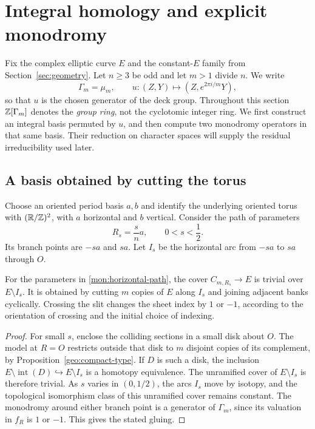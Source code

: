 \section{Integral homology and explicit monodromy}\label{sec:monodromy}

Fix the complex elliptic curve $E$ and the constant-$E$ family from
Section~\ref{sec:geometry}.  Let $n\geq3$ be odd and let $m>1$ divide
$n$.  We write
\[
 \Gamma_m=\mu_m,\qquad u:(Z,Y)\longmapsto(Z,e^{2\pi i/m}Y),
\]
so that $u$ is the chosen generator of the deck group.
Throughout this section $\mathbb Z[\Gamma_m]$ denotes the \emph{group ring}, not
the cyclotomic integer ring.  We first construct an integral basis
permuted by $u$, and then compute two monodromy operators in that same
basis.  Their reduction on character spaces will supply the residual
irreducibility used later.

\subsection{A basis obtained by cutting the torus}

Choose an oriented period basis $a,b$ and identify the underlying
oriented torus with $(\mathbb R/\mathbb Z)^2$, with $a$ horizontal and $b$ vertical.
Consider the path of parameters
\begin{equation}\label{mon:horizontal-path}
 R_s=\frac{s}{n}a,\qquad 0<s<\frac12.
\end{equation}
Its branch points are $-sa$ and $sa$.  Let $I_s$ be the horizontal arc
from $-sa$ to $sa$ through $O$.

\begin{lemma}\label{mon:slit}
For the parameters in \eqref{mon:horizontal-path}, the cover
$C_{m,R_s}\to E$ is trivial over $E\setminus I_s$.  It is obtained by
cutting $m$ copies of $E$ along $I_s$ and joining adjacent banks
cyclically.  Crossing the slit changes the sheet index by $1$ or $-1$,
according to the orientation of crossing and the initial choice of
indexing.
\end{lemma}

\begin{proof}
For small $s$, enclose the colliding sections in a small disk about
$O$.  The model at $R=O$ restricts outside that disk to $m$ disjoint
copies of its complement, by Proposition~\ref{geo:compact-type}.
If $D$ is such a disk, the inclusion
$E\setminus\operatorname{int}(D)\hookrightarrow E\setminus I_s$
is a homotopy equivalence.  The unramified cover of $E\setminus I_s$
is therefore trivial.  As $s$ varies in $(0,1/2)$, the arcs $I_s$ move by isotopy,
and the topological isomorphism class of this unramified cover remains
constant.  The monodromy around either branch point is a generator
of $\Gamma_m$, since its valuation in $f_R$ is $1$ or $-1$.
This gives the stated gluing.
\end{proof}

